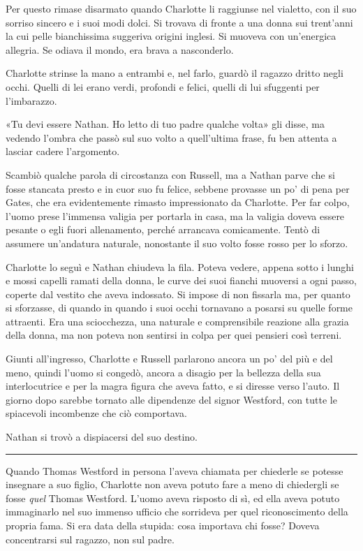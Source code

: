 \documentclass[a4paper,oneside,11pt]{memoir}
\begin{document}
Per questo rimase disarmato quando Charlotte li raggiunse nel vialetto, con il
suo sorriso sincero e i suoi modi dolci. Si trovava di fronte a una donna sui
trent'anni la cui pelle bianchissima suggeriva origini inglesi. Si muoveva con
un'energica allegria. Se odiava il mondo, era brava a nasconderlo.

Charlotte strinse la mano a entrambi e, nel farlo, guardò il ragazzo dritto
negli occhi. Quelli di lei erano verdi, profondi e felici, quelli di lui
sfuggenti per l'imbarazzo.

«Tu devi essere Nathan. Ho letto di tuo padre qualche volta» gli disse, ma
vedendo l'ombra che passò sul suo volto a quell'ultima frase, fu ben attenta a
lasciar cadere l'argomento.

Scambiò qualche parola di circostanza con Russell, ma a Nathan parve che si
fosse stancata presto e in cuor suo fu felice, sebbene provasse un po' di pena
per Gates, che era evidentemente rimasto impressionato da Charlotte. Per far
colpo, l'uomo prese l'immensa valigia per portarla in casa, ma la valigia doveva
essere pesante o egli fuori allenamento, perché arrancava comicamente. Tentò di
assumere un'andatura naturale, nonostante il suo volto fosse rosso per lo
sforzo.

Charlotte lo seguì e Nathan chiudeva la fila. Poteva vedere, appena sotto i
lunghi e mossi capelli ramati della donna, le curve dei suoi fianchi muoversi a
ogni passo, coperte dal vestito che aveva indossato. Si impose di non fissarla
ma, per quanto si sforzasse, di quando in quando i suoi occhi tornavano a
posarsi su quelle forme attraenti. Era una sciocchezza, una naturale e
comprensibile reazione alla grazia della donna, ma non poteva non sentirsi in
colpa per quei pensieri così terreni.

Giunti all'ingresso, Charlotte e Russell parlarono ancora un po' del più e del
meno, quindi l'uomo si congedò, ancora a disagio per la bellezza della sua
interlocutrice e per la magra figura che aveva fatto, e si diresse verso l'auto.
Il giorno dopo sarebbe tornato alle dipendenze del signor Westford, con tutte le
spiacevoli incombenze che ciò comportava.

Nathan si trovò a dispiacersi del suo destino.

\plainbreak{1}

Quando Thomas Westford in persona l'aveva chiamata per chiederle se potesse
insegnare a suo figlio, Charlotte non aveva potuto fare a meno di chiedergli se
fosse \emph{quel} Thomas Westford. L'uomo aveva risposto di sì, ed ella aveva
potuto immaginarlo nel suo immenso ufficio che sorrideva per quel riconoscimento
della propria fama. Si era data della stupida: cosa importava chi fosse? Doveva
concentrarsi sul ragazzo, non sul padre.
\end{document}

